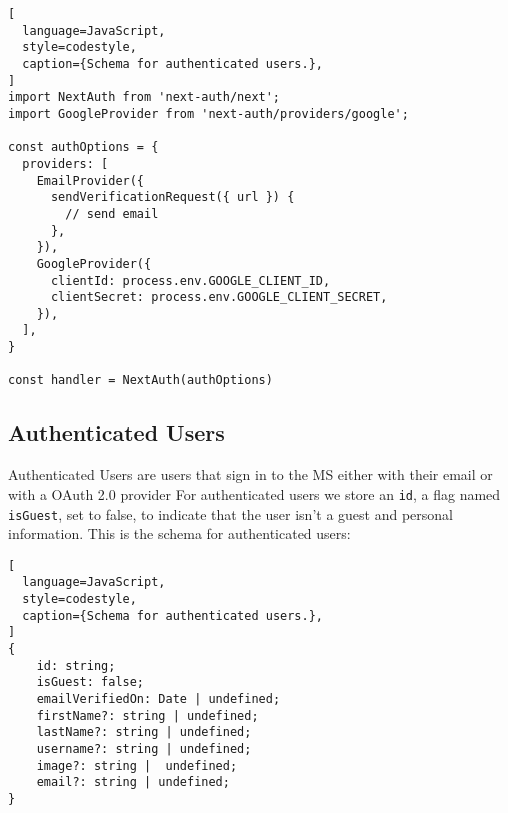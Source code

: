 
\begin{lstlisting}[
  language=JavaScript,
  style=codestyle,
  caption={Schema for authenticated users.},
]
import NextAuth from 'next-auth/next';
import GoogleProvider from 'next-auth/providers/google';

const authOptions = {
  providers: [
    EmailProvider({
      sendVerificationRequest({ url }) {
        // send email
      },
    }),
    GoogleProvider({
      clientId: process.env.GOOGLE_CLIENT_ID,
      clientSecret: process.env.GOOGLE_CLIENT_SECRET,
    }),
  ],
}

const handler = NextAuth(authOptions)
\end{lstlisting}


%
%


\subsection{Authenticated Users}
\label{cha:ms-architecture:authenticated-users}

Authenticated Users are users that sign in to the MS either with their email or with a
OAuth 2.0 provider
For authenticated users we store an \lstinline{id}, a flag named \lstinline{isGuest}, set
to false, to indicate that the user isn't a guest and personal information.
This is the schema for authenticated users:

\begin{lstlisting}[
  language=JavaScript,
  style=codestyle,
  caption={Schema for authenticated users.},
]
{
    id: string;
    isGuest: false;
    emailVerifiedOn: Date | undefined;
    firstName?: string | undefined;
    lastName?: string | undefined;
    username?: string | undefined;
    image?: string |  undefined;
    email?: string | undefined;
}
\end{lstlisting}

